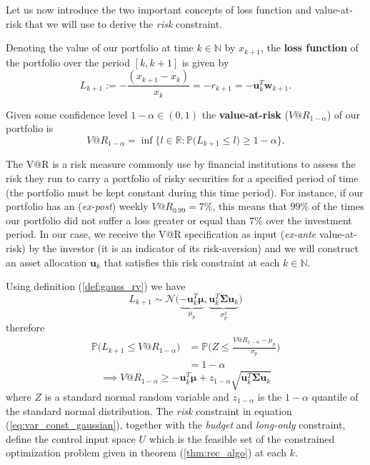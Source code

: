 Let us now introduce the two important concepts of loss function and value-at-risk that we will use to derive the \textit{risk} constraint.
\begin{definition}\label{def:loss_function}
	Denoting the value of our portfolio at time $k \in \mathbb{N}$ by $x_{k+1}$, the \textbf{loss function} of the portfolio over the period $[k,k+1]$ is given by \[ L_{k+1}:= -\frac{(x_{k+1}-x_k)}{x_k}= -r_{k+1} = -\bm{u}_k^T \bm{w}_{k+1}.  \]
\end{definition}
\begin{definition}
	Given some confidence level $1-\alpha \in (0,1) $ the \textbf{value-at-risk} ($V@R_{1-\alpha}$) of our portfolio is \[ V@R_{1-\alpha} = \inf\{l\in \mathbb{R} : \mathbb{P}\big(L_{k+1} \leq l \big) \geq 1-\alpha \}. \]
\end{definition}
	

The V@R is a risk measure commonly use by financial institutions to assess the risk they run to carry a portfolio of risky securities for a specified period of time (the portfolio must be kept constant during this time period). For instance, if our portfolio has an (\textit{ex-post}) weekly $V@R_{0.99} = 7\%$, this means that $99\%$ of the times our portfolio did not suffer a loss greater or equal than $7\%$ over the investment period. In our case, we receive the V@R specification  as input (\textit{ex-ante} value-at-risk) by the investor (it is an indicator of its risk-aversion) and we will construct an asset allocation $\bm{u}_k$ that satisfies this risk constraint at each $k \in \mathbb{N}$.

Using definition (\ref{def:gauss_rv}) we have \[ L_{k+1} \sim \mathcal{N}\big(\underbrace{-\bm{u}_k^T \bm{\mu}}_{\mu_p},\underbrace{\bm{u}_k^T \bm{\Sigma} \bm{u}_k}_{\sigma^2_p} \big)\] therefore
\begin{align*}
\mathbb{P}\big(L_{k+1} \leq V@R_{1-\alpha}\big) 
& = \mathbb{P}\Big(Z \leq \frac{V@R_{1-\alpha} - \mu_p}{\sigma_p}  \Big) \\
& = 1 - \alpha
\end{align*}
\begin{equation}\label{eq:var_const_gaussian}
\implies \boxed{V@R_{1-\alpha} \geq -\bm{u}_k^T\bm{\mu} + z_{1-\alpha} \sqrt{\bm{u}_k^T \bm{\Sigma} \bm{u}_k}}
\end{equation}
where $Z$ is a standard normal random variable and $z_{1-\alpha}$ is the $1-\alpha$ quantile of the standard normal distribution. The \textit{risk} constraint in equation (\ref{eq:var_const_gaussian}), together with the \textit{budget} and \textit{long-only} constraint, define the control input space $U$ which is the feasible set of the constrained optimization problem given in theorem (\ref{thm:rec_algo}) at each $k$.
